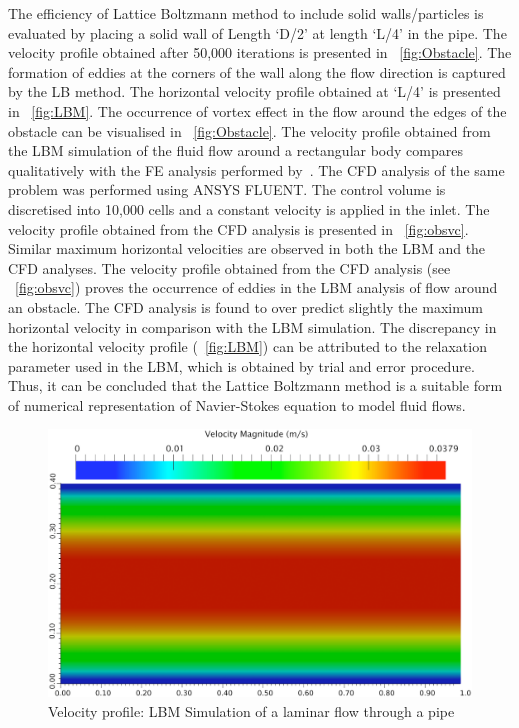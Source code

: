 The efficiency of Lattice Boltzmann method to include solid walls/particles is evaluated by placing a solid wall of Length `D/2' at length `L/4' in the pipe. The velocity profile obtained after 50,000 iterations is presented in ~\cref{fig:Obstacle}. The formation of eddies at the corners of the wall along the flow direction is captured by the LB method. The horizontal velocity profile obtained at `L/4' is presented in ~\cref{fig:LBM}. The occurrence of vortex effect in the flow around the edges of the obstacle can be visualised in ~\cref{fig:Obstacle}. The velocity profile obtained from the LBM simulation of the fluid flow around a rectangular body compares qualitatively with the FE analysis performed by~\citet{Zhong1991}. The CFD analysis of the same problem was performed using ANSYS FLUENT. The control volume is discretised into 10,000 cells and a constant velocity is applied in the inlet. The velocity profile obtained from the CFD analysis is presented in ~\cref{fig:obsvc}. Similar maximum horizontal velocities are observed in both the LBM and the CFD analyses. The velocity profile obtained from the CFD analysis (see ~\cref{fig:obsvc}) proves the occurrence of eddies in the LBM analysis of flow around an obstacle. The CFD analysis is found to over predict slightly the maximum horizontal velocity in comparison with the LBM simulation. The discrepancy in the horizontal velocity profile (~\cref{fig:LBM}) can be attributed to the relaxation parameter used in the LBM, which is obtained by trial and error procedure. Thus, it can be concluded that the Lattice Boltzmann method is a suitable form of numerical representation of Navier-Stokes equation to model fluid flows. 
\begin{figure}[h]
\centering
\includegraphics[width=\textwidth]{Chapter3/figures/lbm/LBM_Poiseuille.png}
\caption{Velocity profile: LBM Simulation of a laminar flow through a pipe}
\label{fig:LBM_Poiseuille}
\end{figure}

